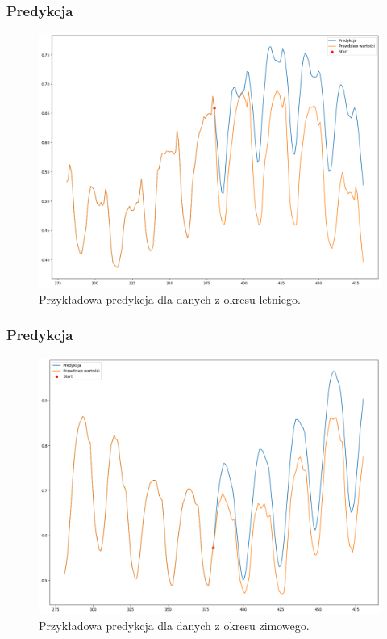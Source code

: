 \documentclass[]{beamer}
\begin{document}
\begin{frame}
  \frametitle{Predykcja}
  \begin{figure}
    \centering
    \includegraphics[width=0.8\linewidth]{pred_lato.png}
    \caption{Przykładowa predykcja dla danych z okresu letniego.}
  \end{figure}
\end{frame}

\begin{frame}
  \frametitle{Predykcja}
  \begin{figure}
    \centering
    \includegraphics[width=0.8\linewidth]{pred_zima.png}
    \caption{Przykładowa predykcja dla danych z okresu zimowego.}
  \end{figure}
\end{frame}
\end{document}
